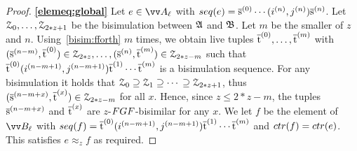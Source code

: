 \begin{proof}
\noindent
\textbf{\ref{elemeq:global}}
Let $e \in \unraveldom{A}_{\ell}$ with $\seq{e} = \elemtuples^{(0)}\cdots{}(i^{(n)}, j^{(n)})\elemtuples^{(n)}$.
Let $\mathcal{Z}_{0}, \ldots, \mathcal{Z}_{2*z + 1}$ be the bisimulation between ${\mathfrak{A}}$ and ${\mathfrak{B}}$.
Let $m$ be the smaller of $z$ and $n$.
Using~\ref{bisim:fforth} $m$ times, we obtain live tuples $\overline{\mathrm{t}}^{(0)}, \ldots, \overline{\mathrm{t}}^{(m)}$ with $(\overline{\mathrm{s}}^{(n-m)}, \overline{\mathrm{t}}^{(0)}) \in \mathcal{Z}_{2*z}, \ldots, (\overline{\mathrm{s}}^{(n)}, \overline{\mathrm{t}}^{(m)}) \in \mathcal{Z}_{2*z - m}$ such that $\overline{\mathrm{t}}^{(0)}(i^{(n-m+1)}, j^{(n-m+1)})\overline{\mathrm{t}}^{(1)}\cdots{}\overline{\mathrm{t}}^{(m)}$ is a bisimulation sequence.
For any bisimulation it holds that $\mathcal{Z}_{0} \supseteq \mathcal{Z}_{1} \supseteq \cdots{} \supseteq \mathcal{Z}_{2*z+1}$, thus
$(\overline{\mathrm{s}}^{(n-m+x)}, \overline{\mathrm{t}}^{(x)}) \in \mathcal{Z}_{2*z - m}$ for all $x$.
Hence, since $z \le 2*z - m$, the tuples $\overline{\mathrm{s}}^{(n-m+x)}$ and $\overline{\mathrm{t}}^{(x)}$ are $z$-$\FGF$-bisimilar for any $x$.
We let $f$ be the element of $\unraveldom{B}_{\ell}$ with $\seq{f} = \elemtuplet^{(0)}(i^{(n-m+1)}, j^{(n-m+1)})\elemtuplet^{(1)}\cdots{}\elemtuplet^{(m)}$ and $\ctr{f} = \ctr{e}$.
This satisfies $e \approx_{z} f$ as required.


\end{proof}
